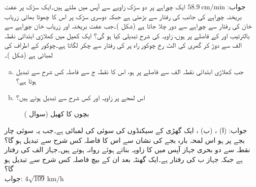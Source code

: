 جواب:\quad
$\SI{58.9}{\centi\meter/\minute}$
\quad
ایک چوراہے پر دو سڑک  زاویے سے آپس میں ملتے ہیں۔ایک سڑک پر عفت بریخنہ چوراہے کی جانب  کی رفتار سے بڑھتی ہے جبکہ دوسری سڑک پر اس کا چھوٹا بھائی زریاب خان  کی رفتار سے چوراہے سے دور چلا جاتا ہے (شکل )۔جب عفت بریخنہ اور زریاب خان چوراہے سے بالترتیب  اور  کے فاصلے پر ہوں، زاویہ  کی شرح تبدیلی کیا ہو گی؟ 
ایک کھیل میں کھلاڑی ابتدائی نقطہ الف سے دوڑ کر گھری کی الٹ رخ چوکور راہ پر  کی رفتار سے چکر لگاتا ہے۔چوکور کے اطراف کی لمبائی  ہے (شکل )۔
\begin{enumerate}[a.]
\item
جب کھلاڑی ابتدائی نقطہ الف سے  فاصلے پر ہو، اس کا نقطہ ج سے فاصلہ کس شرح سے تبدیل ہوتا ہے؟
\item
اس لمحے پر زاویہ  اور  کس شرح سے تبدیل ہوتے ہیں؟ 
\end{enumerate}
%
\begin{figure}
\centering
{}
\caption{بچوں کا کھیل (سوال )}
\label{شکل_سوال_تفرق_کھیل}
\end{figure}

جواب:\quad
(ا) ، (ب) ، 
ایک گھڑی کے سیکنڈوں کی سوئی کی لمبائی  ہے۔جب یہ سوئی چار بجے پر ہو اس لمحہ بارہ بجے کی نشان سے اس کا فاصلہ کس شرح سے تبدیل ہو گا؟ 
\quad
نقطہ  سے دو بحری جہاز آپس میں  کا زاویہ بناتے ہوئے روانہ ہوتے ہیں۔جہاز الف کی رفتار  ہے جبکہ جہاز ب کی رفتار  ہے۔ایک گھنٹہ بعد ان کے بیچ فاصلہ کس شرح سے تبدیل ہو گا؟\\
جواب:\quad
$4\sqrt{109}\,\si{\kilo\meter\per\hour}$
